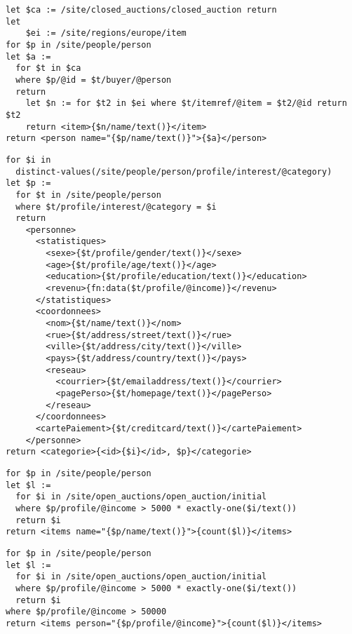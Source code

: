\begin{lstlisting}[float=htpb, caption=Test query 9., frame=single, label=listing_test_query_9]
let $ca := /site/closed_auctions/closed_auction return
let
    $ei := /site/regions/europe/item
for $p in /site/people/person
let $a :=
  for $t in $ca
  where $p/@id = $t/buyer/@person
  return
    let $n := for $t2 in $ei where $t/itemref/@item = $t2/@id return $t2
    return <item>{$n/name/text()}</item>
return <person name="{$p/name/text()}">{$a}</person>
\end{lstlisting}

\begin{lstlisting}[float=htpb, caption=Test query 10., frame=single, label=listing_test_query_10]
for $i in
  distinct-values(/site/people/person/profile/interest/@category)
let $p :=
  for $t in /site/people/person
  where $t/profile/interest/@category = $i
  return
    <personne>
      <statistiques>
        <sexe>{$t/profile/gender/text()}</sexe>
        <age>{$t/profile/age/text()}</age>
        <education>{$t/profile/education/text()}</education>
        <revenu>{fn:data($t/profile/@income)}</revenu>
      </statistiques>
      <coordonnees>
        <nom>{$t/name/text()}</nom>
        <rue>{$t/address/street/text()}</rue>
        <ville>{$t/address/city/text()}</ville>
        <pays>{$t/address/country/text()}</pays>
        <reseau>
          <courrier>{$t/emailaddress/text()}</courrier>
          <pagePerso>{$t/homepage/text()}</pagePerso>
        </reseau>
      </coordonnees>
      <cartePaiement>{$t/creditcard/text()}</cartePaiement>
    </personne>
return <categorie>{<id>{$i}</id>, $p}</categorie>
\end{lstlisting}

\begin{lstlisting}[float=htpb, caption=Test query 11., frame=single, label=listing_test_query_11]
for $p in /site/people/person
let $l :=
  for $i in /site/open_auctions/open_auction/initial
  where $p/profile/@income > 5000 * exactly-one($i/text())
  return $i
return <items name="{$p/name/text()}">{count($l)}</items>
\end{lstlisting}

\begin{lstlisting}[float=htpb, caption=Test query 12., frame=single, label=listing_test_query_12]
for $p in /site/people/person
let $l :=
  for $i in /site/open_auctions/open_auction/initial
  where $p/profile/@income > 5000 * exactly-one($i/text())
  return $i
where $p/profile/@income > 50000
return <items person="{$p/profile/@income}">{count($l)}</items>
\end{lstlisting}

